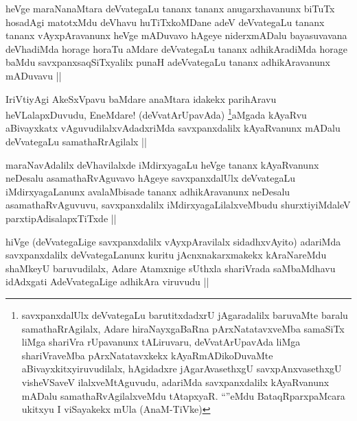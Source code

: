 
\begin{artha}
heVge maraNanaMtara deVvategaLu tananx tananx anugarxhavanunx biTuTx hosadAgi matotxMdu deVhavu huTiTxkoMDane adeV deVvategaLu tananx tananx vAyxpAravanunx heVge mADuvavo hAgeye niderxmADalu bayasuvavana deVhadiMda horage horaTu aMdare deVvategaLu tananx adhikAradiMda horage baMdu savxpanxsaqSiTxyalilx punaH adeVvategaLu tananx adhikAravanunx mADuvavu ||
\end{artha}

\begin{artha}
IriVtiyAgi AkeSxVpavu baMdare anaMtara idakekx parihAravu heVLalapxDuvudu, EneMdare! (deVvatArUpavAda) \footnote{savxpanxdalUlx deVvategaLu barutitxdadxrU jAgaradalilx baruvaMte baralu samathaRrAgilalx, Adare hiraNayxgaBaRna pArxNatatavxveMba samaSiTx liMga shariVra rUpavanunx tALiruvaru, deVvatArUpavAda liMga shariVraveMba pArxNatatavxkekx kAyaRmADikoDuvaMte aBivayxkitxyiruvudilalx, hAgidadxre jAgarAvasethxgU savxpAnxvasethxgU visheVSaveV ilalxveMtAguvudu, adariMda savxpanxdalilx kAyaRvanunx mADalu samathaRvAgilalxveMdu tAtapxyaR. ``\stext''eMdu BataqRparxpaMcara ukitxyu I viSayakekx mUla (AnaM-TiVke)}aMgada kAyaRvu aBivayxkatx vAguvudilalxvAdadxriMda savxpanxdalilx kAyaRvanunx mADalu deVvategaLu samathaRrAgilalx ||
\end{artha}


\begin{artha}
maraNavAdalilx deVhavilalxde iMdirxyagaLu heVge tananx kAyaRvanunx neDesalu asamathaRvAguvavo hAgeye savxpanxdalUlx deVvategaLu iMdirxyagaLanunx avalaMbisade tananx adhikAravanunx neDesalu asamathaRvAguvuvu, savxpanxdalilx iMdirxyagaLilalxveMbudu shurxtiyiMdaleV parxtipAdisalapxTiTxde ||
\end{artha}

\begin{artha}
hiVge (deVvategaLige savxpanxdalilx vAyxpAravilalx sidadhxvAyito) adariMda savxpanxdalilx deVvategaLanunx kuritu jAcnxnakarxmakekx kAraNareMdu shaMkeyU baruvudilalx, Adare Atamxnige sUthxla shariVrada saMbaMdhavu idAdxgati AdeVvategaLige adhikAra viruvudu ||
\end{artha}


